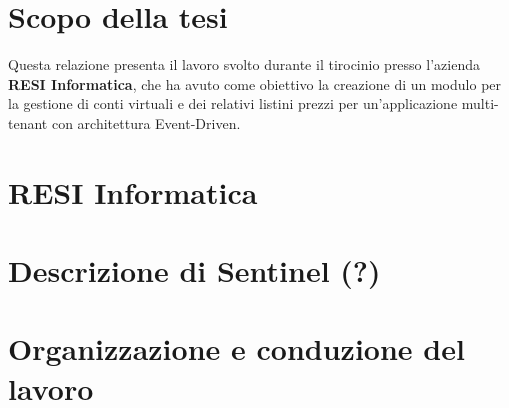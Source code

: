 \section{Scopo della tesi}
Questa relazione presenta il lavoro svolto durante il tirocinio presso l'azienda \textbf{RESI Informatica}, che ha avuto come obiettivo la creazione di un modulo per la
gestione di conti virtuali e dei relativi listini prezzi per un'applicazione multi-tenant con architettura Event-Driven.

\section{RESI Informatica}

\section{Descrizione di Sentinel (?)}


\section{Organizzazione e conduzione del lavoro}
